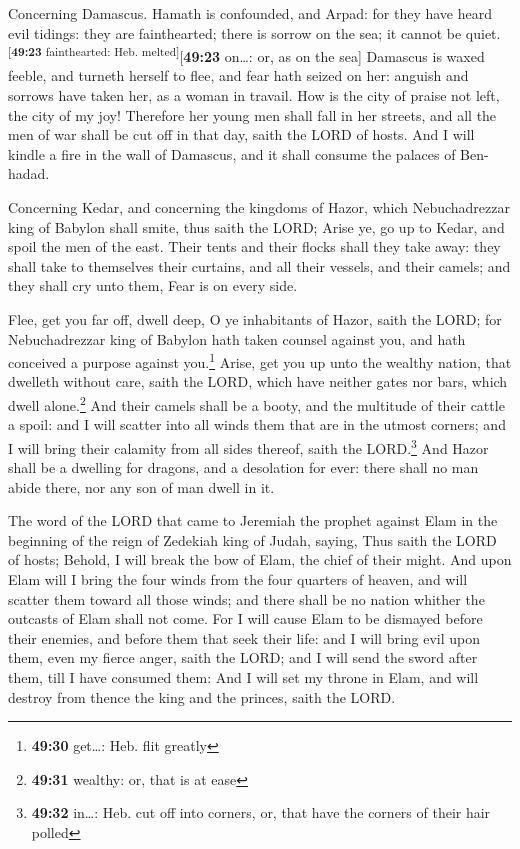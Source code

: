  Concerning Damascus. Hamath is confounded, and Arpad:
for they have heard evil tidings: they are fainthearted; there is sorrow
on the sea; it cannot be quiet.\textsuperscript{{[}\textbf{49:23}
fainthearted: Heb. melted{]}}{[}\textbf{49:23} on\ldots: or, as on the
sea{]}  Damascus is waxed feeble, and turneth herself to
flee, and fear hath seized on her: anguish and sorrows have taken her,
as a woman in travail.  How is the city of praise not
left, the city of my joy!  Therefore her young men shall
fall in her streets, and all the men of war shall be cut off in that
day, saith the LORD of hosts.  And I will kindle a fire
in the wall of Damascus, and it shall consume the palaces of Ben-hadad.

 Concerning Kedar, and concerning the kingdoms of Hazor,
which Nebuchadrezzar king of Babylon shall smite, thus saith the LORD;
Arise ye, go up to Kedar, and spoil the men of the east. 
Their tents and their flocks shall they take away: they shall take to
themselves their curtains, and all their vessels, and their camels; and
they shall cry unto them, Fear is on every side.

 Flee, get you far off, dwell deep, O ye inhabitants of
Hazor, saith the LORD; for Nebuchadrezzar king of Babylon hath taken
counsel against you, and hath conceived a purpose against
you.\footnote{\textbf{49:30} get\ldots: Heb. flit greatly}
 Arise, get you up unto the wealthy nation, that dwelleth
without care, saith the LORD, which have neither gates nor bars, which
dwell alone.\footnote{\textbf{49:31} wealthy: or, that is at ease}
 And their camels shall be a booty, and the multitude of
their cattle a spoil: and I will scatter into all winds them that are in
the utmost corners; and I will bring their calamity from all sides
thereof, saith the LORD.\footnote{\textbf{49:32} in\ldots: Heb. cut off
  into corners, or, that have the corners of their hair polled}
 And Hazor shall be a dwelling for dragons, and a
desolation for ever: there shall no man abide there, nor any son of man
dwell in it.

 The word of the LORD that came to Jeremiah the prophet
against Elam in the beginning of the reign of Zedekiah king of Judah,
saying,  Thus saith the LORD of hosts; Behold, I will
break the bow of Elam, the chief of their might.  And
upon Elam will I bring the four winds from the four quarters of heaven,
and will scatter them toward all those winds; and there shall be no
nation whither the outcasts of Elam shall not come.  For
I will cause Elam to be dismayed before their enemies, and before them
that seek their life: and I will bring evil upon them, even my fierce
anger, saith the LORD; and I will send the sword after them, till I have
consumed them:  And I will set my throne in Elam, and
will destroy from thence the king and the princes, saith the LORD.

